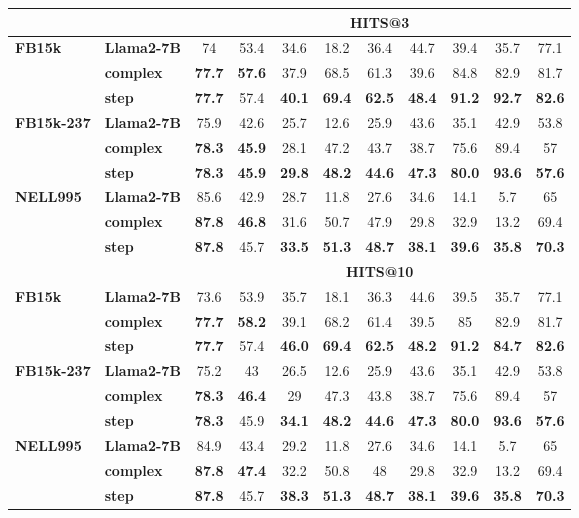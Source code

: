 \documentclass{article} %
\begin{document}
{\begin{table}[htbp]
\begin{tabular}{ll|ccccccccc}
\hline
& &\multicolumn{9}{c}{\textbf{HITS@3}}\\
\hline
\textbf{FB15k} &\textbf{Llama2-7B} &74&53.4&34.6&18.2&36.4&44.7&39.4&35.7&77.1\\
&\textbf{complex} &\textbf{77.7}&\textbf{57.6}&37.9&68.5&61.3&39.6&84.8&82.9&81.7\\
&\textbf{step} &\textbf{77.7}&57.4&\textbf{40.1}&\textbf{69.4}&\textbf{62.5}&\textbf{48.4}&\textbf{91.2}&\textbf{92.7}&\textbf{82.6}\\
\hline
\textbf{FB15k-237} &\textbf{Llama2-7B} &75.9&42.6&25.7&12.6&25.9&43.6&35.1&42.9&53.8\\
&\textbf{complex} &\textbf{78.3}&\textbf{45.9}&28.1&47.2&43.7&38.7&75.6&89.4&57\\
&\textbf{step} &\textbf{78.3}&\textbf{45.9}&\textbf{29.8}&\textbf{48.2}&\textbf{44.6}&\textbf{47.3}&\textbf{80.0}&\textbf{93.6}&\textbf{57.6}\\
\hline
\textbf{NELL995} &\textbf{Llama2-7B} &85.6&42.9&28.7&11.8&27.6&34.6&14.1&5.7&65\\
&\textbf{complex} &\textbf{87.8}&\textbf{46.8}&31.6&50.7&47.9&29.8&32.9&13.2&69.4\\
&\textbf{step} &\textbf{87.8}&45.7&\textbf{33.5}&\textbf{51.3}&\textbf{48.7}&\textbf{38.1}&\textbf{39.6}&\textbf{35.8}&\textbf{70.3}\\
\hline
& &\multicolumn{9}{c}{\textbf{HITS@10}}\\
\hline
\textbf{FB15k} &\textbf{Llama2-7B} &73.6&53.9&35.7&18.1&36.3&44.6&39.5&35.7&77.1\\
&\textbf{complex} &\textbf{77.7}&\textbf{58.2}&39.1&68.2&61.4&39.5&85&82.9&81.7\\
&\textbf{step} &\textbf{77.7}&57.4&\textbf{46.0}&\textbf{69.4}&\textbf{62.5}&\textbf{48.2}&\textbf{91.2}&\textbf{84.7}&\textbf{82.6}\\
\hline
\textbf{FB15k-237} &\textbf{Llama2-7B} &75.2&43&26.5&12.6&25.9&43.6&35.1&42.9&53.8\\
&\textbf{complex} &\textbf{78.3}&\textbf{46.4}&29&47.3&43.8&38.7&75.6&89.4&57\\
&\textbf{step} &\textbf{78.3}&45.9&\textbf{34.1}&\textbf{48.2}&\textbf{44.6}&\textbf{47.3}&\textbf{80.0}&\textbf{93.6}&\textbf{57.6}\\
\hline
\textbf{NELL995} &\textbf{Llama2-7B} &84.9&43.4&29.2&11.8&27.6&34.6&14.1&5.7&65\\
&\textbf{complex} &\textbf{87.8}&\textbf{47.4}&32.2&50.8&48&29.8&32.9&13.2&69.4\\
&\textbf{step} &\textbf{87.8}&45.7&\textbf{38.3}&\textbf{51.3}&\textbf{48.7}&\textbf{38.1}&\textbf{39.6}&\textbf{35.8}&\textbf{70.3}\\
\hline
\end{tabular}%
\label{tab:hits_standard}
\end{table}

}
\end{document}
